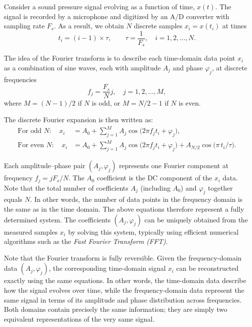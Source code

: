 \documentclass[12pt,a4paper]{article}
\begin{document}
Consider a sound pressure signal evolving as a function of time, $x(t)$. The signal is recorded by a microphone and digitized by an A/D converter with sampling rate \(F_s\). As a result, we obtain $N$ discrete samples $x_i = x(t_i)$ at times
\[
t_i = (i-1) \times \tau, \qquad \tau = \frac{1}{F_s}, \quad i = 1, 2, \ldots, N.
\]

The idea of the Fourier transform is to describe each time-domain data point \(x_i\)
as a combination of sine waves, each with amplitude \(A_j\) and phase \(\varphi_j\),
at discrete frequencies
\[
f_j = \frac{F_s}{N}j, \quad j = 1, 2, \ldots, M,
\]
where \(M = (N - 1)/2\) if \(N\) is odd, or \(M = N/2 - 1\) if \(N\) is even.

The discrete Fourier expansion is then written as:
\begin{align}
\text{For odd } N:\quad
x_i &= A_0 + \sum_{j=1}^{M} A_j \cos\!\big(2\pi f_j t_i + \varphi_j\big), \\[6pt]
\text{For even } N:\quad
x_i &= A_0 + \sum_{j=1}^{M} A_j \cos\!\big(2\pi f_j t_i + \varphi_j\big)
      + A_{N/2}\cos\!\big(\pi\, t_i / \tau\big).
\end{align}

Each amplitude–phase pair \((A_j, \varphi_j)\) represents one Fourier component at frequency \(f_j = jF_s/N\). The $A_0$ coefficient is the DC component of the $x_i$ data. Note that the total number of coefficients $A_j$ (including $A_0$) and $\varphi_j$ together equals \(N\). In other words, the number of data points in the frequency domain is the same as in the time domain. The above equations therefore represent a fully determined system. The coefficients \((A_j, \varphi_j)\) can be uniquely obtained from the measured samples \(x_i\) by solving this system, typically using efficient numerical algorithms such as the
\emph{Fast Fourier Transform (FFT)}.

Note that the Fourier transform is fully reversible. Given the frequency-domain data \((A_j, \varphi_j)\), the corresponding time-domain signal \(x_i\) can be reconstructed exactly using the same equations.  
In other words, the time-domain data describe how the signal evolves over time, while the frequency-domain data represent the same signal in terms of its amplitude and phase distribution across frequencies. Both domains contain precisely the same information; they are simply two equivalent representations of the very same signal.
\end{document}
